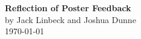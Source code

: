 \documentclass[11pt]{article}
\begin{document}
\begin{center}
    \LARGE \textbf{Reflection of Poster Feedback}\\[0.5cm]
    \large by Jack Linbeck and Joshua Dunne \\[0.3cm]
    \today
\end{center}
\large
\begin{center}
\end{center}
\end{document}
